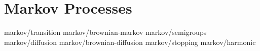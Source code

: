 \chapter	{Markov Processes}

	{markov/transition}
	{markov/brownian-markov}
	{markov/semigroups}
	{markov/diffusion}
	{markov/brownian-diffusion}
	{markov/stopping}
	{markov/harmonic}

